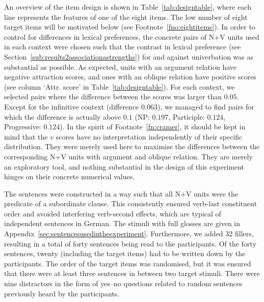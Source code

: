 \documentclass[biblatex, charis, linguex]{glossa}\usepackage{knitr}
\begin{document}
An overview of the item design is shown in Table~\ref{tab:designtable}, where each line represents the features of one of the eight items.
The low number of eight target items will be motivated below (see Footnote~\ref{fno:eightitems}).
In order to control for differences in lexical preferences, the concrete pairs of N+V units used in each context were chosen such that the contrast in lexical preference (see Section~\ref{sub:results2associationastrengths}) for and against univerbation was as substantial as possible.
As expected, units with an argument relation have negative attraction scores, and ones with an oblique relation have positive scores (see column `Attr. score' in Table~\ref{tab:designtable}).
For each context, we selected pairs where the difference between the scores was larger than $0.05$.
Except for the infinitive context (difference $0.063$), we managed to find pairs for which the difference is actually above $0.1$ (NP: $0.197$, Participle: $0.124$, Progressive: $0.124$).
In the spirit of Footnote~\mbox{\ref{fn:cramer}}, it should be kept in mind that the $v$ scores have no interpretation independently of their specific distribution.
They were merely used here to maximise the differences between the corresponding N+V units with argument and oblique relation.
They are merely an exploratory tool, and nothing substantial in the design of this experiment hinges on their concrete numerical values.

The sentences were constructed in a way such that all N+V units were the predicate of a subordinate clause.
This consistently ensured verb-last constituent order and avoided interfering verb-second effects, which are typical of independent sentences in German.
The stimuli with full glosses are given in Appendix~\ref{sec:sentencesusedintheexperiment}.
Furthermore, we added 32 fillers, resulting in a total of forty sentences being read to the participants.
Of the forty sentences, twenty (including the target items) had to be written down by the participants.
The order of the target items was randomised, but it was ensured that there were at least three sentences in between two target stimuli.
There were nine distractors in the form of yes--no questions related to random sentences previously heard by the participants.
\end{document}

